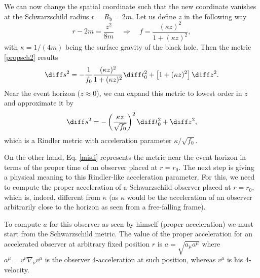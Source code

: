 We can now change the spatial coordinate such that the new coordinate
vanishes at the Schwarzschild radius $r=R_{\text{b}}=2m$. Let us define
$z$ in the following way
 \begin{equation}\label{defz}
 r-2m=\frac{z^2}{8m}\quad\Rightarrow\quad
  f=\frac{(\kappa z)^2}{1+(\kappa z)^2},
 \end{equation}
 with $\kappa =1/(4m)$ being the surface gravity of the black hole. Then the metric \eqref{propsch2} results
 \begin{equation}\label{change1}
 \diff s^2=-\frac{1}{f_0}\frac{(\kappa z)^2}{1+(\kappa z)^2}\diff t_0^2+
 \left[1+(\kappa z)^2\right]\diff z^2.
 \end{equation}
Near the event horizon ($z\approx0$), we can expand this metric to
lowest order in $z$ and approximate it by
\begin{equation}\label{misli}
\diff s^2=-\left(\frac{\kappa z}{\sqrt{f_0}}\right)^2\diff t_0^2+\diff z^2,
\end{equation}
which is a Rindler metric with acceleration parameter
$\kappa/\sqrt{f_0}$.

  On the other hand, Eq. \eqref{misli} represents
the metric near the event horizon in terms of the proper time of an
observer placed at $r=r_0$. The next step is giving a physical meaning to
this Rindler-like acceleration parameter. For this, we need to compute the
proper acceleration of a Schwarzschild observer placed at $r=r_0$,
which is, indeed, different from $\kappa$ (as $\kappa$ would be the
acceleration of an observer arbitrarily close to the horizon as seen from
a free-falling frame).

To compute $a$ for this observer as seen by himself (proper
acceleration) we must start from the Schwarzschild metric. The value of
the proper acceleration for an accelerated observer at arbitrary fixed
position $r$ is $a=\sqrt{a_\mu a^\mu}$ where $a^\mu=v^\nu\nabla_\nu
v^\mu$ is the observer 4-acceleration at such position, whereas $v^\mu$
is his 4-velocity.

